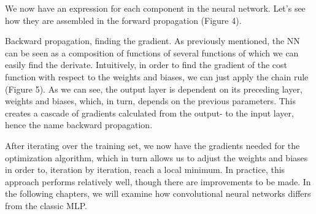 \startsubsection[title=Forward propagation]
We now have an expression for each component in the neural network.
Let’s see how they are assembled in the forward propagation (Figure 4).
\stopsubsection

\startsubsection[title=Backward propogation]
Backward propagation, finding the gradient. 
As previously mentioned, the NN can be seen as a composition of functions of several functions of which we can easily find the derivate.
Intuitively, in order to find the gradient of the cost function with respect to the weights and biases, we can just apply the chain rule (Figure 5).
As we can see, the output layer is dependent on its preceding layer, weights and biases, which, in turn, depends on the previous parameters.
This creates a cascade of gradients calculated from the output- to the input layer, hence the name backward propagation.  

After iterating over the training set, we now have the gradients needed for the optimization algorithm, which in turn allows us to adjust the weights and biases in order to, iteration by iteration, reach a local minimum.
In practice, this approach performs relatively well, though there are improvements to be made.
In the following chapters, we will examine how convolutional neural networks differs from the classic MLP. 
\stopsubsection
\stopsection
